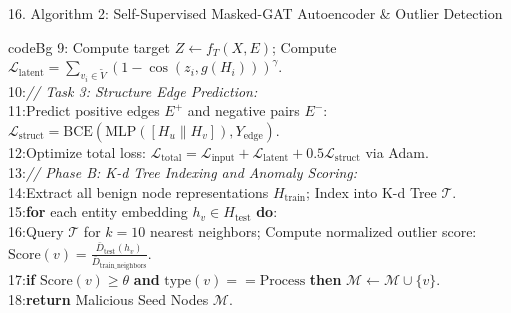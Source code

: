 \documentclass[aspectratio=169,10pt]{beamer}
\begin{document}
\begin{frame}{16. Algorithm 2: Self-Supervised Masked-GAT Autoencoder \& Outlier Detection}
\begin{beamercolorbox}[rounded=true,shadow=false,sep=0.20em,wd=0.98\textwidth]{codeBg}
{9: \quad Compute target $Z \leftarrow f_T(X, E)$; Compute $\mathcal{L}_{\text{latent}} = \sum_{v_i \in \tilde{V}} (1 - \cos(z_i, g(H_i)))^\gamma$.\\
10:\quad \textit{// Task 3: Structure Edge Prediction:}\\
11:\quad Predict positive edges $E^+$ and negative pairs $E^-$: $\mathcal{L}_{\text{struct}} = \text{BCE}(\text{MLP}([H_u \parallel H_v]), Y_{\text{edge}})$.\\
12:\quad Optimize total loss: $\mathcal{L}_{\text{total}} = \mathcal{L}_{\text{input}} + \mathcal{L}_{\text{latent}} + 0.5 \mathcal{L}_{\text{struct}}$ via Adam.\\
13:\textit{// Phase B: K-d Tree Indexing and Anomaly Scoring:}\\
14:Extract all benign node representations $H_{\text{train}}$; Index into K-d Tree $\mathcal{T}$.\\
15:\textbf{for} each entity embedding $h_v \in H_{\text{test}}$ \textbf{do}:\\
16:\quad Query $\mathcal{T}$ for $k=10$ nearest neighbors; Compute normalized outlier score: $\text{Score}(v) = \frac{\bar{D}_{\text{test}}(h_v)}{\bar{D}_{\text{train\_neighbors}}}$.\\
17:\quad \textbf{if} $\text{Score}(v) \ge \theta$ \textbf{and} $\text{type}(v) == \text{Process}$ \textbf{then} $\mathcal{M} \leftarrow \mathcal{M} \cup \{v\}$.\\
18:\textbf{return} Malicious Seed Nodes $\mathcal{M}$.
}
\end{beamercolorbox}
\end{frame}
\end{document}
